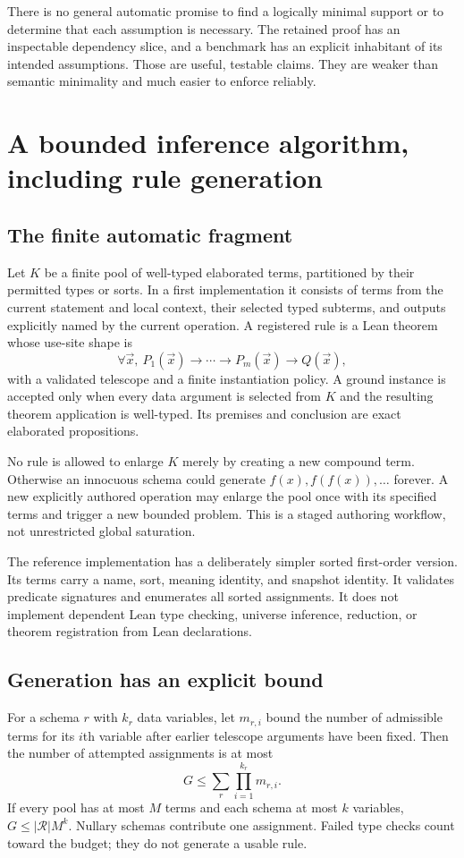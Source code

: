 \documentclass[11pt,letterpaper]{article}
\theoremstyle{definition}\newtheorem{definition}[theorem]{Definition}
\theoremstyle{remark}\newtheorem{remark}[theorem]{Remark}
\begin{document}
There is no general automatic promise to find a logically minimal support or
to determine that each assumption is necessary. The retained proof has an
inspectable dependency slice, and a benchmark has an explicit inhabitant of
its intended assumptions. Those are useful, testable claims. They are weaker
than semantic minimality and much easier to enforce reliably.

\section{A bounded inference algorithm, including rule generation}
\label{sec:engine}

\subsection{The finite automatic fragment}
Let $K$ be a finite pool of well-typed elaborated terms, partitioned by their
permitted types or sorts. In a first implementation it consists of terms from
the current statement and local context, their selected typed subterms, and
outputs explicitly named by the current operation. A registered rule is a
Lean theorem whose use-site shape is
\[
 \forall \vec x,\ P_1(\vec x)\to\cdots\to P_m(\vec x)\to Q(\vec x),
\]
with a validated telescope and a finite instantiation policy. A ground instance
is accepted only when every data argument is selected from $K$ and the
resulting theorem application is well-typed. Its premises and conclusion are
exact elaborated propositions.

No rule is allowed to enlarge $K$ merely by creating a new compound term.
Otherwise an innocuous schema could generate $f(x),f(f(x)),\ldots$ forever.
A new explicitly authored operation may enlarge the pool once with its
specified terms and trigger a new bounded problem. This is a staged authoring
workflow, not unrestricted global saturation.

The reference implementation has a deliberately simpler sorted first-order
version. Its terms carry a name, sort, meaning identity, and snapshot identity.
It validates predicate signatures and enumerates all sorted assignments.
It does not implement dependent Lean type checking, universe inference,
reduction, or theorem registration from Lean declarations.

\subsection{Generation has an explicit bound}
For a schema $r$ with $k_r$ data variables, let $m_{r,i}$ bound the number of
admissible terms for its $i$th variable after earlier telescope arguments have
been fixed. Then the number of attempted assignments is at most
\begin{equation}\label{eq:ground-bound}
 G\le\sum_r\prod_{i=1}^{k_r}m_{r,i}.
\end{equation}
If every pool has at most $M$ terms and each schema at most $k$ variables,
$G\le |\mathcal R|M^k$. Nullary schemas contribute one assignment. Failed
type checks count toward the budget; they do not generate a usable rule.
\end{document}
